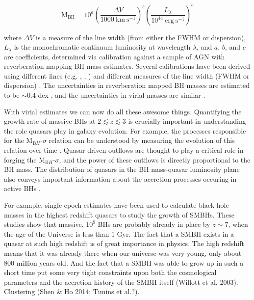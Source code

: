 \begin{equation}
  \label{eq:virialmass}
  \mathrm{M_{BH}} = 10^{a} \left( \frac{\Delta V}{1000~\mathrm{km~s^{-1}}} \right)^b \left( \frac{L_{\lambda}}{10^{44}~\mathrm{erg~s^{-1}}} \right)^c
\end{equation}

\noindent where $\Delta V$ is a measure of the line width (from either the FWHM or dispersion), $L_\lambda$ is the monochromatic continuum luminosity at wavelength $\lambda$, and $a$, $b$, and $c$ are coefficients, determined via calibration against a sample of AGN with reverberation-mapping BH mass estimates. Several calibrations have been derived using different lines (e.g. \hbns, , ) and different measures of the line width (FWHM or dispersion) \citep[e.g.][]{vestergaard02,mclure02,vestergaard06,mcgill08,wang09,rafiee11,park13}.
The uncertainties in reverberation mapped BH masses are estimated to be $\sim 0.4$ dex \citep[e.g.][]{peterson10}, and the uncertainties in virial masses are similar \citep[e.g.][]{vestergaard06}.

With virial estimates we can now do all these awesome things. 
Quantifying the growth-rate of massive BHs at $2 \lesssim z \lesssim 3$ is crucially important in understanding the role quasars play in galaxy evolution.
For example, the processes responsible for the M$_{\mathrm BH}$-$\sigma$ relation can be understood by measuring the evolution of this relation over time \citep[e.g.][]{bennert11}. 
Quasar-driven outflows are thought to play a critical role in forging the M$_{\mathrm BH}$-$\sigma$, and the power of these outflows is directly proportional to the BH mass. 
The distribution of quasars in the BH mass-quasar luminosity plane also conveys important information about the accretion processes occuring in active BHs \citep[e.g.][]{kollmeier06}.

For example, single epoch estimates have been used to calculate black hole masses in the highest redshift quasars to study the growth of SMBHs. 
These studies show that massive, $10^9$ BHs are probably already in place by $z\sim7$, when the age of the Universe is less than $1$ Gyr.
The fact that a SMBH exists in a quasar at such high redshift is of great importance in physics.
The high redshift means that it was already there when our universe was very young, only about
$800$ million years old. And the fact that a SMBH was able to grow up in such a short time put
some very tight constraints upon both the cosmological parameters and the accretion history of the
SMBH itself (Willott et al. 2003).
Clustering (Shen \& Ho 2014; Timins et al.?). 


